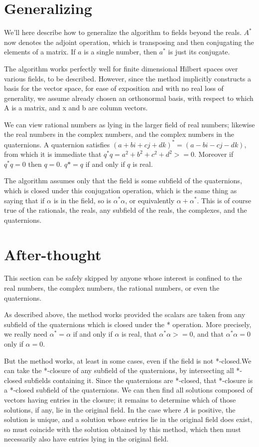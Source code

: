 \documentclass[12pt]{article}
\begin{document}
\section{Generalizing}

We'll here describe how to generalize the algorithm to fields beyond the reals.
$A^*$ now denotes the adjoint operation, which is transposing and then
conjugating the elements of a matrix. If $a$ is a single number, then $a^*$ is
just its conjugate.

The algorithm works perfectly well for finite dimensional Hilbert spaces over various fields, to be described. However, since the method implicitly constructs a basis for the vector space, for ease of exposition and with no real loss of generality, we assume already chosen an orthonormal basis, with respect to which A is a matrix, and x and b are column vectors.

We can view rational numbers as lying in the larger field of real numbers; likewise the real numbers in the complex numbers, and the complex numbers in the quaternions. A quaternion satisfies $(a + bi +cj + dk)^* = (a -bi -cj -dk)$, from which it is immediate that $q^*q = a^2 + b^2 + c^2 + d^2 >= 0$. Moreover if $q^*q =0$ then $q =0$.
$q* = q$ if and only if $q$ is real.

The algorithm assumes only that the field is some subfield of the quaternions, which is closed under this conjugation operation, which is the same thing as saying that if $\alpha$ is in the field, so is $\alpha^*\alpha$, or equivalently $\alpha + \alpha^*$. This is of course true of the rationals, the reals, any subfield of the reals, the complexes, and the quaternions.

\section{After-thought}
This section can be safely skipped by anyone whose interest is confined to
the real numbers, the complex numbers, the rational numbers, or even the quaternions.

As described above, the method works provided the scalars are taken from any subfield of the
quaternions which is closed under the * operation. More precisely, we really
need $\alpha^* = \alpha$ if and only if $\alpha$ is real, that $\alpha^*\alpha >= 0$, and that 
$\alpha^*\alpha = 0$ only if $\alpha=0$.

But the method works, at least in some cases, even if the field is not *-closed.We can take the *-closure of any subfield of the quaternions, by intersecting all *-closed subfields containing it. Since the quaternions are *-closed, that *-closure is a *-closed subfield of the quaternions. We can then find all solutions composed of vectors having entries in the closure; it remains to determine
which of those solutions, if any, lie in the original field. In the case where
$A$ is positive, the solution is unique, and a solution whose entries lie in the original field does exist, so must coincide with the solution obtained by this method, which then must necessarily also have entries lying in the original field.
\newpage
\end{document}
